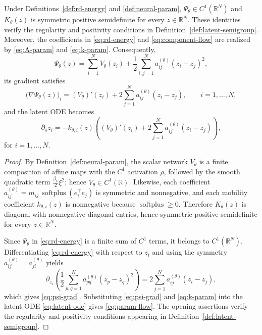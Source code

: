 \documentclass[hidelinks,review,nohypdvips,onefignum,onetabnum]{siamart220329}
\newcommand{\R}{\mathbb{R}}
\newcommand{\softplus}{\operatorname{softplus}}
\begin{document}
\begin{proposition}\label{prop:param-dynamics}
Under Definitions~\ref{def:rd-energy} and \ref{def:neural-param}, \(\Psi_\theta\in C^1(\R^N)\) and \(K_\theta(z)\) is symmetric positive semidefinite for every \(z\in\R^N\). These identities verify the regularity and positivity conditions in Definition~\ref{def:latent-semigroup}. Moreover, the coefficients in \eqref{eq:rd-energy} and \eqref{eq:component-flow} are realized by \eqref{eq:A-param} and \eqref{eq:k-param}. Consequently,
\begin{equation}\label{eq:psi-param}
\Psi_{\theta}(z)=\sum_{i=1}^N V_{\theta}(z_i)+\frac12\sum_{i,j=1}^N a_{ij}^{(\theta)}(z_i-z_j)^2,
\end{equation}
its gradient satisfies
\begin{equation}\label{eq:psi-grad}
\bigl(\nabla\Psi_{\theta}(z)\bigr)_i=(V_{\theta})'(z_i)+2\sum_{j=1}^N a_{ij}^{(\theta)}(z_i-z_j), \qquad i=1,\dots,N,
\end{equation}
and the latent ODE becomes
\begin{equation}\label{eq:param-flow}
\partial_s z_i=-k_{\theta,i}(z)\left((V_{\theta})'(z_i)+2\sum_{j=1}^N a_{ij}^{(\theta)}(z_i-z_j)\right),
\end{equation}
for \(i=1,\dots,N\).
\end{proposition}

\begin{proof}
By Definition~\ref{def:neural-param}, the scalar network \(V_{\theta}\) is a finite composition of affine maps with the \(C^1\) activation \(\rho\), followed by the smooth quadratic term \(\frac{\beta_V}{2}\xi^2\); hence \(V_{\theta}\in C^1(\R)\). Likewise, each coefficient \(a_{ij}^{(\theta)}=m_{ij}\,\softplus(e_i^\top e_j)\) is symmetric and nonnegative, and each mobility coefficient \(k_{\theta,i}(z)\) is nonnegative because \(\softplus\ge 0\). Therefore \(K_{\theta}(z)\) is diagonal with nonnegative diagonal entries, hence symmetric positive semidefinite for every \(z\in \R^N\).

Since \(\Psi_{\theta}\) in \eqref{eq:rd-energy} is a finite sum of \(C^1\) terms, it belongs to \(C^1(\R^N)\). Differentiating \eqref{eq:rd-energy} with respect to \(z_i\) and using the symmetry \(a_{ij}^{(\theta)}=a_{ji}^{(\theta)}\) yields
\begin{equation*}
\partial_{z_i}\!\left(\frac12\sum_{p,q=1}^N a_{pq}^{(\theta)}(z_p-z_q)^2\right)=2\sum_{j=1}^N a_{ij}^{(\theta)}(z_i-z_j),
\end{equation*}
which gives \eqref{eq:psi-grad}. Substituting \eqref{eq:psi-grad} and \eqref{eq:k-param} into the latent ODE \eqref{eq:latent-ode} gives \eqref{eq:param-flow}. The opening assertions verify the regularity and positivity conditions appearing in Definition~\ref{def:latent-semigroup}.
\end{proof}
\end{document}

